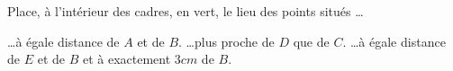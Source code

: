 %
%
Place, à l'intérieur des cadres, en vert, le lieu des points situés \dots
  \begin{tasks}
    \task \dots à égale distance de $A$ et de $B$.
    \task \dots plus proche de $D$ que de $C$.
    \task \dots à égale distance de $E$ et de $B$ et à exactement $3cm$ de $B$.
  \end{tasks}
